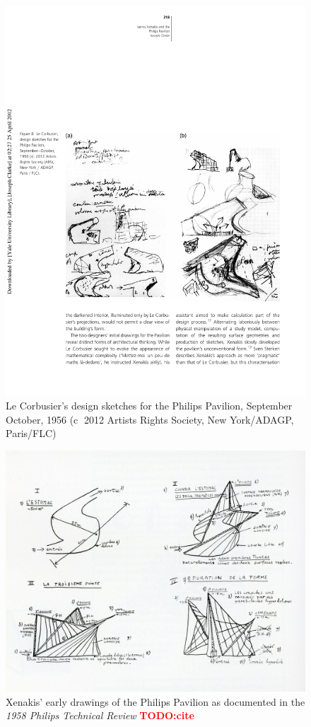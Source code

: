 \documentclass{tufte-book}
\newcommand{\TODO}[1]{\textcolor{red}{\bf TODO:#1}\xspace}
\begin{document}
\begin{figure}[h]
  \includegraphics[width=\linewidth]{LeCorbusierDraw.pdf}
  \caption{Le Corbusier's design sketches for the Philips Pavilion,
    September \textendash{} October, 1956 (\textcircled{c} 2012 Artists Rights
    Society, New York/ADAGP, Paris/FLC)}
  \label{fig:le-corbusier-draw}
\end{figure}

\begin{figure}[h]
  \includegraphics[width=\linewidth]{PhilipsDrawings.jpg}
  \caption{Xenakis' early drawings of the Philips Pavilion as
    documented in the \textit{1958 Philips Technical Review} \TODO{cite}}
  \label{fig:xenakis-draw}
\end{figure}
\end{document}
